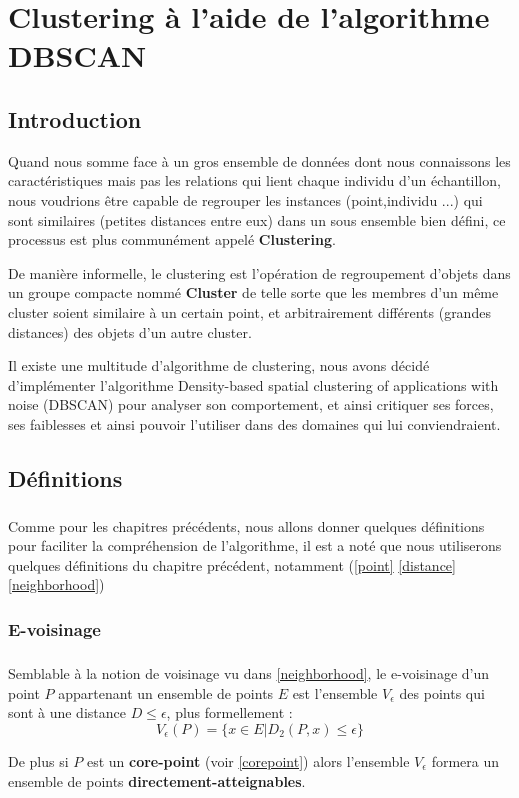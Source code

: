 \chapter{Clustering à l'aide de l'algorithme DBSCAN}\label{dbscan}
\section{Introduction}
	Quand nous somme face à un gros ensemble de données dont nous connaissons les caractéristiques mais pas les relations qui lient chaque individu d'un échantillon, nous voudrions être capable de regrouper les instances (point,individu ...) qui sont similaires (petites distances entre eux) dans un sous ensemble bien défini, ce processus est plus communément appelé \textbf{Clustering}.
	\par De manière informelle, le clustering est l'opération de regroupement d'objets dans un groupe compacte nommé \textbf{Cluster} de telle sorte que les membres d'un même cluster soient similaire à un certain point, et arbitrairement différents (grandes distances) des objets d'un autre cluster.
	\par 
	Il existe une multitude d'algorithme de clustering, nous avons décidé d'implémenter l'algorithme Density-based spatial clustering of applications with noise (DBSCAN) pour analyser son comportement, et ainsi critiquer ses forces, ses faiblesses et ainsi pouvoir l'utiliser dans des domaines qui lui conviendraient.
\section{Définitions}
	\paragraph{}
	Comme pour les chapitres précédents, nous allons donner quelques définitions pour faciliter la compréhension de l'algorithme, il est a noté que nous utiliserons quelques définitions du chapitre précédent, notamment (\ref{point} \ref{distance} \ref{neighborhood})
	\subsection{E-voisinage}
		\paragraph{}
		Semblable à la notion de voisinage vu dans \ref{neighborhood}, le e-voisinage d'un point $P$ appartenant un ensemble de points $E$ est l'ensemble $V_\epsilon$ des points qui sont à une distance $D \leq \epsilon$, plus formellement : 
		\[
			V_\epsilon(P) = \lbrace x \in E | D_2(P,x) \leq \epsilon \rbrace
		\] 
		\par De plus si $P$ est un \textbf{core-point} (voir \ref{corepoint}) alors l'ensemble $V_\epsilon$ formera un ensemble de points \textbf{directement-atteignables}.
